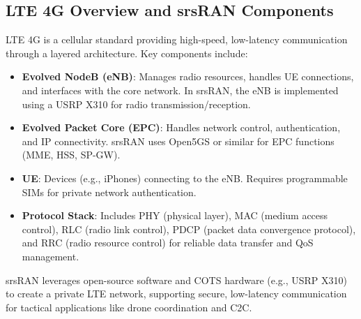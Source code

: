 \documentclass{article}
\begin{document}
\subsection{LTE 4G Overview and srsRAN Components}
LTE 4G is a cellular standard providing high-speed, low-latency communication through
a layered architecture. Key components include:
\begin{itemize}
\item \textbf{Evolved NodeB (eNB)}: Manages radio resources, handles UE connections, and interfaces with the core network. In srsRAN, the eNB is implemented using a USRP X310 for radio transmission/reception.
\item \textbf{Evolved Packet Core (EPC)}: Handles network control, authentication, and IP connectivity. srsRAN uses Open5GS or similar for EPC functions (MME, HSS, SP-GW).
\item \textbf{UE}: Devices (e.g., iPhones) connecting to the eNB. Requires programmable SIMs for private network authentication.
\item \textbf{Protocol Stack}: Includes PHY (physical layer), MAC (medium access control), RLC (radio link control), PDCP (packet data convergence protocol), and RRC (radio resource control) for reliable data transfer and QoS management.
\end{itemize}

srsRAN leverages open-source software and COTS hardware (e.g., USRP X310) to create a
private LTE network, supporting secure, low-latency communication for tactical applications
like drone coordination and C2C.
\end{document}
